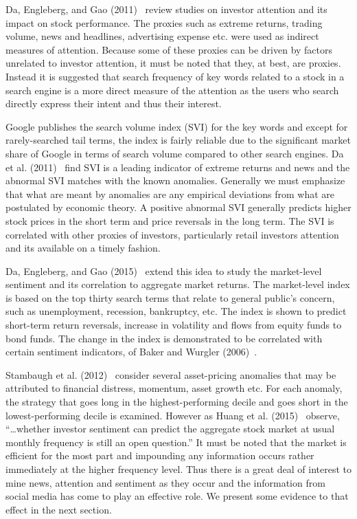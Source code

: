 Da, Engleberg, and Gao (2011)~\cite{da2011search} review studies on investor attention and its impact on stock performance. The proxies such as extreme returns, trading volume, news and headlines, advertising expense etc. were used as indirect measures of attention. Because some of these proxies can be driven by factors unrelated to investor attention, it must be noted that they, at best, are proxies. Instead it is suggested that search frequency of key words related to a stock in a search engine is a more direct measure of the attention as the users who search directly express their intent and thus their interest.


Google publishes the search volume index (SVI) for the key words and except for rarely-searched tail terms, the index is fairly reliable due to the significant market share of Google in terms of search volume compared to other search engines. Da et al. (2011)~\cite{da2011search} find SVI is a leading indicator of extreme returns and news and the abnormal SVI matches with the known anomalies. Generally we must emphasize that what are meant by anomalies are any empirical deviations from what are postulated by economic theory. A positive abnormal SVI generally predicts higher stock prices in the short term and price reversals in the long term. The SVI is correlated with other proxies of investors, particularly retail investors attention and its available on a timely fashion. 


Da, Engleberg, and Gao (2015)~\cite{da2015sum} extend this idea to study the market-level sentiment and its correlation to aggregate market returns. The market-level index is based on the top thirty search terms that relate to general public's concern, such as unemployment, recession, bankruptcy, etc. The index is shown to predict short-term return reversals, increase in volatility and flows from equity funds to bond funds. The change in the index is demonstrated to be correlated with certain sentiment indicators, of Baker and Wurgler (2006)~\cite{baker2006investor}.


Stambaugh et al. (2012)~\cite{stamb} consider several asset-pricing anomalies that may be attributed to financial distress, momentum, asset growth etc. For each anomaly, the strategy that goes long in the highest-performing decile and goes short in the lowest-performing decile is examined. However as Huang et al. (2015)~\cite{huang} observe, ``\dots whether investor sentiment can predict the aggregate stock market at usual monthly frequency is still an open question.'' It must be noted that the market is efficient for the most part and impounding any information occurs rather immediately at the higher frequency level. Thus there is a great deal of interest to mine news, attention and sentiment as they occur and the information from social media has come to play an effective role. We present some evidence to that effect in the next section. 



